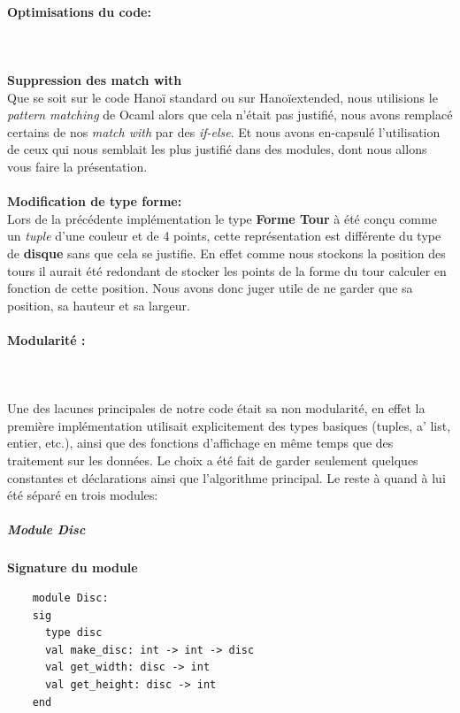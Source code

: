 \documentclass[a4paper,11pt]{article}
\begin{document}
\paragraph{Optimisations du code:} \mbox{}\\\\
\textbf{Suppression des match with}\\
Que se soit sur le code Hanoï standard ou sur Hanoïextended, nous utilisions le \textit{pattern matching} de Ocaml alors que cela n'était pas justifié, nous avons remplacé certains de nos  \textit{match with} par des \textit{if-else}.
Et nous avons en-capsulé l'utilisation de ceux qui nous semblait les plus justifié dans des modules, dont nous allons vous faire la présentation.\\\\
\textbf{Modification de type forme:}\\
Lors de la précédente implémentation le type \textbf{Forme Tour} à été conçu comme un \textit{tuple} d'une couleur et de 4 points, cette représentation est différente du type de \textbf{disque} sans que cela se justifie.
En effet comme nous stockons la position des tours il aurait été redondant de stocker les points de la forme du tour calculer en fonction de cette position.
Nous avons donc juger utile de ne garder que sa position, sa hauteur et sa largeur.

\paragraph{Modularité :}\mbox{}\\\\
Une des lacunes principales de notre code était sa non modularité, en effet la première implémentation utilisait explicitement des types basiques (tuples, a' list, entier, etc.), ainsi que des fonctions d'affichage en même temps que des traitement sur les données.
Le choix a été fait de garder seulement quelques constantes et déclarations ainsi que l'algorithme principal.
Le reste à quand à lui été séparé en trois modules:

\subparagraph{Module Disc}
\begin{center}
	\textbf{Signature du module}
	\begin{lstlisting}
	module Disc:
	sig
	  type disc
	  val make_disc: int -> int -> disc
	  val get_width: disc -> int
	  val get_height: disc -> int
	end
	\end{lstlisting}
\end{center}
\end{document}
